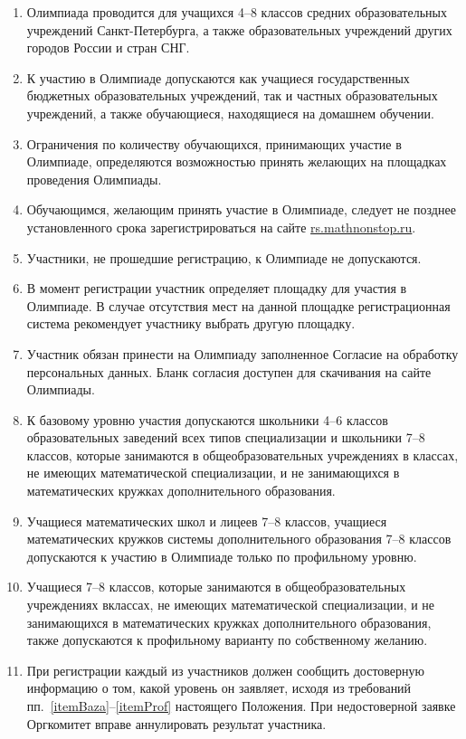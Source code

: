 \documentclass[a4paper,12pt]{article}
\newcommand{\surl}[1]{{\small\url{#1}}}
\begin{document}
\begin{enumerate}
	\item Олимпиада проводится для учащихся 4–8 классов средних образовательных учреждений Санкт-Петербурга, а также образовательных учреждений других городов России и стран СНГ.
	\item К участию в Олимпиаде допускаются как учащиеся государственных бюджетных образовательных учреждений, так и частных образовательных учреждений, а также обучающиеся, находящиеся на домашнем обучении.
	\item Ограничения по количеству обучающихся, принимающих участие в Олимпиаде, определяются возможностью принять желающих на площадках проведения Олимпиады.
	\item Обучающимся, желающим принять участие в Олимпиаде, следует не позднее установленного срока зарегистрироваться на сайте \surl{rs.mathnonstop.ru}.
	\item Участники, не прошедшие регистрацию, к Олимпиаде не допускаются.
	\item В момент регистрации участник определяет площадку для участия в Олимпиаде. В случае отсутствия мест на данной площадке регистрационная система рекомендует участнику выбрать другую площадку.
	\item Участник обязан принести на Олимпиаду заполненное Согласие на обработку персональных данных. Бланк согласия доступен для скачивания на сайте Олимпиады.
	\item \label{itemBaza}
	   К базовому уровню участия допускаются школьники 4–6 классов
	   образовательных заведений всех типов специализации и
	   школьники 7–8 классов, которые занимаются в общеобразовательных
	   учреждениях в классах, не имеющих математической специализации,
	   и не занимающихся в математических кружках дополнительного образования.
	\item Учащиеся математических школ и лицеев 7–8 классов,
	   учащиеся математических кружков системы дополнительного образования
	   7–8 классов допускаются к участию в Олимпиаде
	   только по профильному уровню.
	\item \label{itemProf}
	   Учащиеся 7–8 классов, которые занимаются в общеобразовательных
	   учреждениях в\linebreak классах, не имеющих математической специализации,
	   и не занимающихся в математических кружках дополнительного образования,
	   также допускаются к профильному варианту по собственному желанию.
	\item При регистрации каждый из участников должен сообщить
	   достоверную информацию о том, какой уровень он заявляет, исходя из
	   требований пп.~\ref{itemBaza}–\ref{itemProf} настоящего Положения.
	   При недостоверной заявке Оргкомитет вправе аннулировать
	   результат участника.
\end{enumerate}
\end{document}
